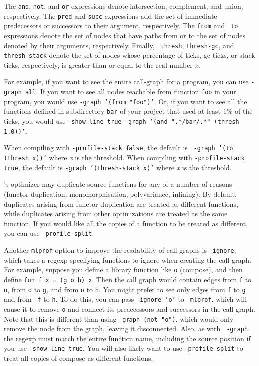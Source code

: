 The {\tt and}, {\tt not}, and {\tt or} expressions denote
intersection, complement, and union, respectively.  The {\tt pred} and
{\tt succ} expressions add the set of immediate predecessors or
successors to their argument, respectively.  The {\tt from} and {\tt
to} expressions denote the set of nodes that have paths from or to the
set of nodes denoted by their arguments, respectively.  Finally, {\tt
thresh}, {\tt thresh-gc}, and {\tt thresh-stack} denote the set of
nodes whose percentage of ticks, gc ticks, or stack ticks,
respectively, is greater than or equal to the real number {\it x}.

For example, if you want to see the entire call-graph for a program,
you can use {\tt -graph all}.  If you want to see all nodes reachable
from function {\tt foo} in your program, you would use {\tt -graph
'(from "foo")'}.  Or, if you want to see all the functions defined in
subdirectory {\tt bar} of your project that used at least 1\% of the
ticks, you would use {\tt -show-line true -graph '(and ".*/bar/.*"
(thresh 1.0))'}.

When compiling with {\tt -profile-stack false}, the default is {\tt
-graph '(to (thresh {\it x}))'} where {\it x} is the threshold.  When
compiling with {\tt -profile-stack true}, the default is {\tt -graph
'(thresh-stack {\it x})'} where {\it x} is the threshold.

{\mlton}'s optimizer may duplicate source functions for any of a
number of reasons (functor duplication, monomorphisation,
polyvariance, inlining).  By default, duplicates arising from functor
duplication are treated as different functions, while duplicates
arising from other optimizations are treated as the same function.  If
you would like all the copies of a function to be treated as
different, you can use {\tt -profile-split}.

Another {\tt mlprof} option to improve the readability of call graphs
is {\tt -ignore}, which takes a regexp specifying functions to ignore
when creating the call graph.  For example, suppose you define a
library function like {\tt o} (compose), and then define {\tt fun f x
= (g o h) x}.  Then the call graph would contain edges from {\tt f} to
{\tt o}, from {\tt o} to {\tt g}, and from {\tt o} to {\tt h}.  You
might prefer to see only edges from {\tt f} to {\tt g} and from {\tt
f} to {\tt h}.  To do this, you can pass {\tt -ignore 'o'} to {\tt
mlprof}, which will cause it to remove {\tt o} and connect its
predecessors and successors in the call graph.  Note that this is
different than using {\tt -graph (not "o")}, which would only remove
the node from the graph, leaving it disconnected.  Also, as with {\tt
-graph}, the regexp must match the entire function name, including the
source position if you use {\tt -show-line true}.  You will also
likely want to use {\tt -profile-split} to treat all copies of compose
as different functions.

